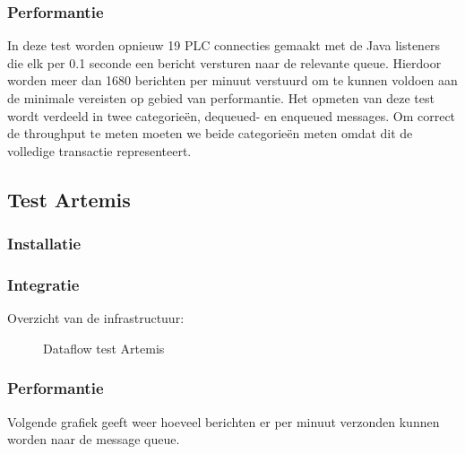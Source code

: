 \subsubsection{Performantie}
In deze test worden opnieuw 19 PLC connecties gemaakt met de Java listeners die elk per 0.1 seconde een bericht versturen naar de relevante queue.
Hierdoor worden meer dan 1680 berichten per minuut verstuurd om te kunnen voldoen aan de minimale vereisten op gebied van performantie.
Het opmeten van deze test wordt verdeeld in twee categorieën, dequeued- en enqueued messages.
Om correct de throughput te meten moeten we beide categorieën meten omdat dit de volledige transactie representeert.

\subsection{Test Artemis}

\subsubsection{Installatie}
 
\subsubsection{Integratie}

Overzicht van de infrastructuur:
\begin{figure}[h!]
  \centering
  \caption{\label{fig:test_artemis_dataflow}Dataflow test Artemis}
\end{figure}

\subsubsection{Performantie}
Volgende grafiek geeft weer hoeveel berichten er per minuut verzonden kunnen worden naar de message queue.









